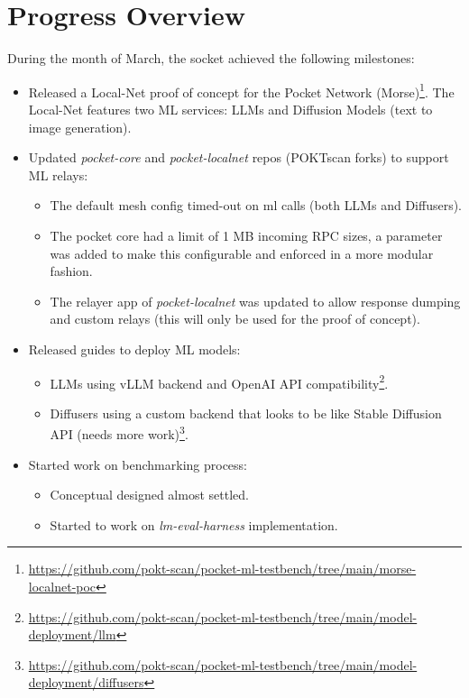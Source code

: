 \section{Progress Overview}\label{sec:a}

During the month of March, the socket achieved the following milestones:

\begin{itemize}
    \item Released a Local-Net proof of concept for the Pocket Network (Morse)\footnote{\url{https://github.com/pokt-scan/pocket-ml-testbench/tree/main/morse-localnet-poc}}. The Local-Net features two \gls{ML} services: \glspl{LLM} and Diffusion Models (text to image generation).
    \item Updated \emph{pocket-core} and \emph{pocket-localnet} repos (POKTscan forks) to support \gls{ML} relays:
    \begin{itemize}
        \item The default mesh config timed-out on ml calls (both \glspl{LLM} and Diffusers).
        \item The pocket core had a limit of 1 MB incoming RPC sizes, a parameter was added to make this configurable and enforced in a more modular fashion.
        \item The relayer app of \emph{pocket-localnet} was updated to allow response dumping and custom relays (this will only be used for the proof of concept).
    \end{itemize}
    \item Released guides to deploy \gls{ML} models:
    \begin{itemize}
        \item \glspl{LLM} using vLLM backend and OpenAI API compatibility\footnote{\url{https://github.com/pokt-scan/pocket-ml-testbench/tree/main/model-deployment/llm}}.
        \item Diffusers using a custom backend that looks to be like Stable Diffusion API (needs more work)\footnote{\url{https://github.com/pokt-scan/pocket-ml-testbench/tree/main/model-deployment/diffusers}}.
    \end{itemize}
    \item Started work on benchmarking process:
    \begin{itemize}
        \item Conceptual designed almost settled.
        \item Started to work on \emph{lm-eval-harness} implementation.
    \end{itemize}
\end{itemize}
